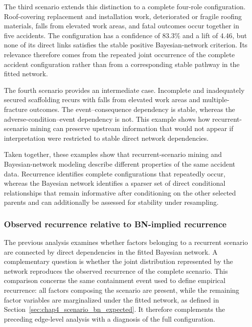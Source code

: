 The third scenario extends this distinction to a complete four-role
configuration. Roof-covering replacement and installation work, deteriorated
or fragile roofing materials, falls from elevated work areas, and fatal
outcomes occur together in five accidents. The configuration has a confidence
of 83.3\% and a lift of 4.46, but none of its direct links satisfies the
stable positive Bayesian-network criterion. Its relevance therefore comes
from the repeated joint occurrence of the complete accident configuration
rather than from a corresponding stable pathway in the fitted network.

The fourth scenario provides an intermediate case. Incomplete and
inadequately secured scaffolding recurs with falls from elevated work areas
and multiple-fracture outcomes. The event--consequence dependency is stable,
whereas the adverse-condition--event dependency is not. This example shows
how recurrent-scenario mining can preserve upstream information that would
not appear if interpretation were restricted to stable direct network
dependencies.

Taken together, these examples show that recurrent-scenario mining and
Bayesian-network modeling describe different properties of the same accident
data. Recurrence identifies complete configurations that repeatedly occur,
whereas the Bayesian network identifies a sparser set of direct conditional
relationships that remain informative after conditioning on the other
selected parents and can additionally be assessed for stability under
resampling.


\subsubsection{Observed recurrence relative to BN-implied recurrence}
\label{sec:chap4_carpentry_bn_recurrence}

The previous analysis examines whether factors belonging to a recurrent
scenario are connected by direct dependencies in the fitted Bayesian network.
A complementary question is whether the joint distribution represented by the
network reproduces the observed recurrence of the complete scenario. This
comparison concerns the same containment event used to define empirical
recurrence: all factors composing the scenario are present, while the
remaining factor variables are marginalized under the fitted network, as
defined in Section~\ref{sec:chap4_scenario_bn_expected}. It therefore
complements the preceding edge-level analysis with a diagnosis of the full
configuration.

